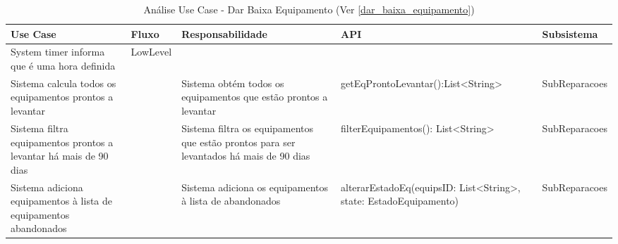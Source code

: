 \documentclass[../relatorio.tex]{subfiles}
\begin{document}
\begin{landscape}
    \begin{table}[!h]
        \centering
        \begin{tabular}{|p{5cm}|p{1cm}|p{4cm}|p{6cm}|p{3cm}|}
            \hline
            \rowcolor{gray!20!white}
            Use Case & Fluxo & Responsabilidade & API & Subsistema \\
            \hline
            \rowcolor{red}
            System timer informa que é uma hora definida
                     & LowLevel
                     &
                     &
                     &
            \\
            \hline
            Sistema calcula todos os equipamentos prontos a levantar 
                     & 
                     & Sistema obtém todos os equipamentos que estão prontos a levantar
                     & getEqProntoLevantar():List<String>
                     & SubReparacoes
            \\
            \hline
            Sistema filtra equipamentos prontos a levantar há mais de 90 dias
                     &
                     & Sistema filtra os equipamentos que estão prontos para ser levantados há mais de 90 dias
                     & filterEquipamentos(): List<String>
                     & SubReparacoes
            \\
            \hline
            Sistema adiciona equipamentos à lista de equipamentos abandonados
                     & 
                     & Sistema adiciona os equipamentos à lista de abandonados
                     & alterarEstadoEq(equipsID: List<String>, state: EstadoEquipamento)
                     & SubReparacoes
            \\
            \hline
        \end{tabular}
        \caption{Análise Use Case - Dar Baixa Equipamento (Ver \ref{dar_baixa_equipamento})}
    \end{table}
\end{landscape}
\end{document}
